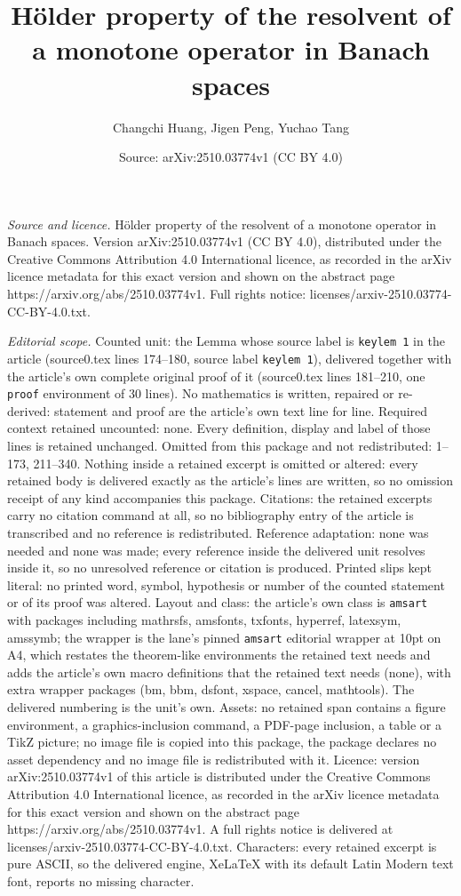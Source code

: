 \documentclass[10pt,a4paper]{amsart}
\title[H\"{o}lder property of the resolvent of a monotone operator ]{H\"{o}lder property of the resolvent of a monotone operator in Banach spaces}
\author{Changchi Huang, Jigen Peng, Yuchao Tang}
\date{Source: arXiv:2510.03774v1 (CC BY 4.0)}
\begin{document}
\maketitle

\noindent\emph{Source and licence.} H\"{o}lder property of the resolvent of a monotone operator in Banach spaces. Version arXiv:2510.03774v1 (CC BY 4.0), distributed under the Creative Commons Attribution 4.0 International licence, as recorded in the arXiv licence metadata for this exact version and shown on the abstract page https://arxiv.org/abs/2510.03774v1. Full rights notice: licenses/arxiv-2510.03774-CC-BY-4.0.txt.\par\smallskip

\noindent\textit{Editorial scope.} Counted unit: the Lemma whose source label is \texttt{keylem 1} in the article (source0.tex lines 174--180, source label \texttt{keylem 1}), delivered together with the article's own complete original proof of it (source0.tex lines 181--210, one \texttt{proof} environment of 30 lines). No mathematics is written, repaired or re-derived: statement and proof are the article's own text line for line. Required context retained uncounted: none. Every definition, display and label of those lines is retained unchanged. Omitted from this package and not redistributed: 1--173, 211--340. Nothing inside a retained excerpt is omitted or altered: every retained body is delivered exactly as the article's lines are written, so no omission receipt of any kind accompanies this package. Citations: the retained excerpts carry no citation command at all, so no bibliography entry of the article is transcribed and no reference is redistributed. Reference adaptation: none was needed and none was made; every reference inside the delivered unit resolves inside it, so no unresolved reference or citation is produced. Printed slips kept literal: no printed word, symbol, hypothesis or number of the counted statement or of its proof was altered. Layout and class: the article's own class is \texttt{amsart} with packages including mathrsfs, amsfonts, txfonts, hyperref, latexsym, amssymb; the wrapper is the lane's pinned \texttt{amsart} editorial wrapper at 10pt on A4, which restates the theorem-like environments the retained text needs and adds the article's own macro definitions that the retained text needs (none), with extra wrapper packages (bm, bbm, dsfont, xspace, cancel, mathtools). The delivered numbering is the unit's own. Assets: no retained span contains a figure environment, a graphics-inclusion command, a PDF-page inclusion, a table or a TikZ picture; no image file is copied into this package, the package declares no asset dependency and no image file is redistributed with it. Licence: version arXiv:2510.03774v1 of this article is distributed under the Creative Commons Attribution 4.0 International licence, as recorded in the arXiv licence metadata for this exact version and shown on the abstract page https://arxiv.org/abs/2510.03774v1. A full rights notice is delivered at licenses/arxiv-2510.03774-CC-BY-4.0.txt. Characters: every retained excerpt is pure ASCII, so the delivered engine, XeLaTeX with its default Latin Modern text font, reports no missing character.
\end{document}
